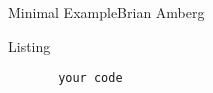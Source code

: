 \documentclass[landscape,final,a0paper,fontscale=0.27065]{baposter}
\begin{document}
 
\begin{poster}{}{}{Minimal Example}{Brian Amberg}{}

 \begin{posterbox}[name=listing,column=0,span=4,row=0]{Listing}
   \begin{lstlisting}
       your code 
   \end{lstlisting}
 \end{posterbox}

 \end{poster}
\end{document}
